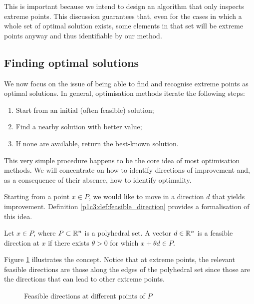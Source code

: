 This is important because we intend to design an algorithm that only inspects extreme points. This discussion guarantees that, even for the cases in which a whole set of optimal solution exists, some elements in that set will be extreme points anyway and thus identifiable by our method.


\subsection{Finding optimal solutions}

We now focus on the issue of being able to find and recognise extreme points as optimal solutions. In general, optimisation methods iterate the following steps:
%
\begin{enumerate}
	\item Start from an initial (often feasible) solution;
	\item Find a nearby solution with better value;
	\item If none are available, return the best-known solution.	
\end{enumerate}
%
This very simple procedure happens to be the core idea of most optimisation methods. We will concentrate on how to identify directions of improvement and, as a consequence of their absence, how to identify optimality.

Starting from a point $x \in P$, we would like to move in a direction $d$ that yields improvement. Definition \ref{p1c3:def:feasible_direction} provides a formalisation of this idea.

\begin{definition} \label{p1c3:def:feasible_direction}
	Let $x \in P$, where $P \subset \mathbb{R}^n$ is a polyhedral set. A vector $d \in \mathbb{R}^n$ is a feasible direction at $x$ if there exists $\theta > 0$ for which $x + \theta d \in P$.
\end{definition}

Figure \ref{p1c3:fig:feasible_directions} illustrates the concept. Notice that at extreme points, the relevant feasible directions are those along the edges of the polyhedral set since those are the directions that can lead to other extreme points.
  
\begin{figure}[h]
	\caption{Feasible directions at different points of $P$} \label{p1c3:fig:feasible_directions}
\end{figure}

